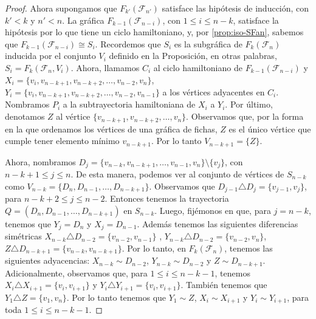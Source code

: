 \begin{proof}
            Ahora supongamos que $F_{k'}(\mathcal{F}_{n'})$ satisface las hip\'otesis de
            inducci\'on, con $k'< k$ y $n'<n$. La gr\'afica $F_{k-1}(\mathcal{F}_{n-i})$,
            con $1 \leq i \leq n-k$, satisface la hip\'otesis por lo que tiene
            un ciclo hamiltoniano, y, por \cref{prop:iso-SFan}, sabemos que
            $F_{k-1}(\mathcal{F}_{n-i}) \cong S_i$. Recordemos que  $S_i$ es la
            subgr\'afica de $F_k(\mathcal{F}_n)$ inducida por el conjunto $V_i$ definido
            en la Proposici\'on, en otras palabras, $S_i= F_k(\mathcal{F}_n, V_i)$. Ahora,
            llamamos $C_i$ al ciclo hamiltoniano de $F_{k-1}(\mathcal{F}_{n-i})$ y $X_i =
            \{v_i, v_{n-k+1}, v_{n-k+2}, \dots, v_{n-2}, v_n\}$, $Y_i= \{v_i,
            v_{n-k+1}, v_{n-k+2}, \dots, v_{n-2}, v_{n-1}\}$ a los v\'ertices
            adyacentes en $C_i$. Nombramos $P_i$ a la subtrayectoria
            hamiltoniana de $X_i$ a $Y_i$. Por \'ultimo, denotamos $Z$ al
            v\'ertice $\{v_{n-k+1}, v_{n-k+2}, \dots, v_n\}$. Observamos que,
            por la forma en la que ordenamos los v\'ertices de una gr\'afica de
            fichas, $Z$ es el \'unico v\'ertice que cumple tener elemento m\'inimo
            $v_{n-k+1}$. Por lo tanto  $V_{n-k+1} = \{Z\}$. 
    
            Ahora, nombramos $D_j =\{v_{n-k}, v_{n-k+1}, \dots, v_{n-1}, v_n\}
            \setminus \{v_j\}$, con $n-k+1 \leq j \leq n$.  De esta manera,
            podemos ver al conjunto de v\'ertices de $S_{n-k}$ como
            $V_{n-k}=\{D_n, D_{n-1}, \dots, D_{n-k+1}\}$. Observamos que
            $D_{j-1} \triangle D_j= \{v_{j-1}, v_j\}$, para $n-k+2 \leq j \leq
            n-2$. Entonces tenemos la trayectoria $Q= (D_n, D_{n-1}, \dots,
            D_{n-k+1})$ en $S_{n-k}$.     
            Luego, fij\'emonos en que, para $j= n-k$, tenemos que $Y_j = D_n$ y
            $X_j= D_{n-1}$. Adem\'as tenemos las siguientes diferencias
            sim\'etricas $X_{n-k}\triangle D_{n-2} =\{v_{n-2}, v_{n-1}\}$ ,
            $Y_{n-k}\triangle D_{n-2} =\{v_{n-2}, v_n\}$, $Z\triangle D_{n-k+1}
            =\{v_{n-k}, v_{n-k+1}\}$. Por lo tanto, en $F_k(\mathcal{F}_n)$, tenemos las
            siguientes adyacencias: $X_{n-k} \sim D_{n-2}$, $Y_{n-k} \sim
            D_{n-2}$ y $Z \sim D_{n-k+1}$. Adicionalmente, observamos que, para
            $1 \leq i \leq n- k- 1$, tenemos $X_{i} \triangle X_{i+1}= \{v_i,
            v_{i+1}\}$ y $Y_i \triangle Y_{i+1} = \{v_i, v_{i+1}\}$. Tambi\'en
            tenemos que $Y_1 \triangle Z = \{v_1, v_n\}$. Por lo tanto tenemos
            que $Y_1 \sim Z$, $X_i \sim X_{i+1}$ y $Y_i \sim Y_{i+1}$, para toda
            $1 \leq i \leq n-k-1$.
            

\end{proof}
